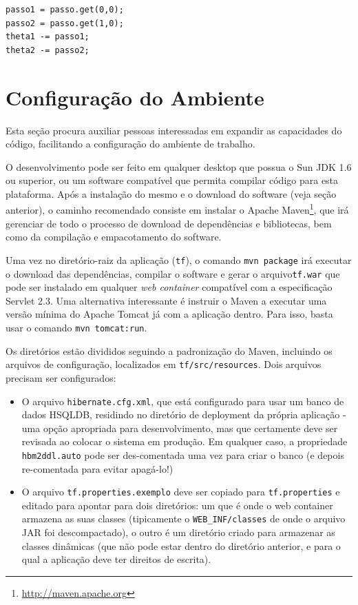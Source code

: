 \documentclass{abnt}
\newenvironment{mylisting}
{\begin{list}{}{\setlength{\leftmargin}{1em}}\item\scriptsize\bfseries}
{\end{list}}
\begin{document}
\begin{mylisting}
\begin{verbatim}
passo1 = passo.get(0,0);
passo2 = passo.get(1,0);
theta1 -= passo1;
theta2 -= passo2;
\end{verbatim}
\end{mylisting}


\section {Configuração do Ambiente}

Esta seção procura auxiliar pessoas interessadas em expandir as capacidades do código, facilitando a configuração do ambiente de trabalho.

O desenvolvimento pode ser feito em qualquer desktop que possua o Sun JDK 1.6 ou superior, ou um software compatível que permita compilar código para esta plataforma. Após a instalação do mesmo e o download do software (veja seção anterior), o caminho recomendado consiste em instalar o Apache Maven\footnote{\url{http://maven.apache.org}}, que irá gerenciar de todo o processo de download de dependências e bibliotecas, bem como da compilação e empacotamento do software.

Uma vez no diretório-raiz da aplicação (\texttt{tf}), o comando \texttt{mvn package} irá executar o download das dependências, compilar o software e gerar o arquivo\texttt{tf.war} que pode ser instalado em qualquer \textit{web container}  compatível com a especificação Servlet 2.3. Uma alternativa interessante é instruir o Maven a executar uma versão mínima do Apache Tomcat já com a aplicação dentro. Para isso, basta usar o comando \texttt{mvn tomcat:run}.

Os diretórios estão divididos seguindo a padronização do Maven, incluindo os arquivos de configuração, localizados em \texttt{tf/src/resources}. Dois arquivos precisam ser configurados:

\begin{itemize}
\item O arquivo \texttt{hibernate.cfg.xml}, que está configurado para usar um banco de dados HSQLDB, residindo no diretório de deployment da própria aplicação - uma opção apropriada para desenvolvimento, mas que certamente deve ser revisada ao colocar o sistema em produção. Em qualquer caso, a propriedade \texttt{hbm2ddl.auto} pode ser des-comentada uma vez para criar o banco (e depois re-comentada para evitar apagá-lo!)
\item O arquivo \texttt{tf.properties.exemplo} deve ser copiado para \texttt{tf.properties} e editado para apontar para dois diretórios: um que é onde o web container armazena as suas classes (tipicamente o \texttt{WEB\_INF/classes} de onde o arquivo JAR foi descompactado), o outro é um diretório criado para armazenar as classes dinâmicas (que não pode estar dentro do diretório anterior, e para o qual a aplicação deve ter direitos de escrita).
\end{itemize}
\end{document}
